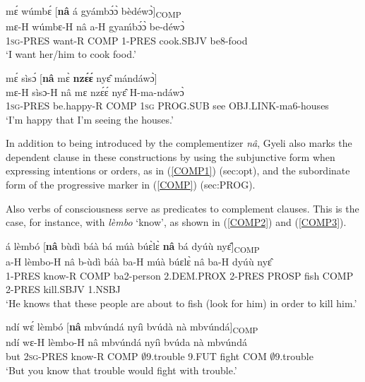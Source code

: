 \begin{exe}
\ex\label{COMP1}
  \glll  mɛ́ wúmbɛ́ [{\bfseries nâ} á gyámbɔ́ɔ̀ bèdéwɔ̀]\textsubscript{COMP} \\
         mɛ-H wúmbɛ-H nâ a-H gyaḿbɔ́ɔ̀ be-déwɔ̀ \\
         1\textsc{sg}-PRES want-R COMP 1-PRES cook.SBJV be8-food \\ 
    \trans `I want her/him to cook food.'
\end{exe}

\begin{exe}
\ex\label{COMP}
  \glll mɛ́  sìsɔ́ [{\bfseries nâ} mɛ̀ {\bfseries nzɛ́ɛ́} nyɛ̂ mándáwɔ̀] \\
         mɛ-H sìsɔ-H nâ mɛ nzɛ́ɛ́ nyɛ̂ H-ma-ndáwɔ̀ \\
         1\textsc{sg}-PRES be.happy-R COMP 1\textsc{sg} PROG.SUB see OBJ.LINK-ma6-houses \\
    \trans `I'm happy that I'm seeing the houses.'
\end{exe}

In addition to being introduced by the complementizer {\itshape nâ}, Gyeli also marks the dependent clause in these constructions by using the subjunctive form when expressing intentions or orders, as in (\ref{COMP1}) ({sec:opt}), and the subordinate form of the progressive marker in (\ref{COMP}) ({sec:PROG}).


Also verbs of consciousness serve as predicates to complement clauses. This is the case, for instance, with {\itshape lèmbo} `know', as shown in (\ref{COMP2}) and (\ref{COMP3}).

\begin{exe} 
\ex\label{COMP2}
  \glll   á lèmbó [{\bfseries nâ} bùdì báà bá múà búɛ̀lɛ̀ {\bfseries nâ} bá dyúù nyɛ̂]\textsubscript{COMP}  \\
          a-H lèmbo-H nâ b-ùdì báà ba-H múà búɛlɛ̀ nâ ba-H dyúù nyɛ̂  \\
1-PRES know-R COMP ba2-person 2.DEM.PROX 2-PRES PROSP fish COMP 2-PRES kill.SBJV 1.NSBJ   \\
    \trans `He knows that these people are about to fish (look for him) in order to kill him.'
\end{exe}

\begin{exe} 
\ex\label{COMP3} 
  \glll ndí wɛ́ lèmbó [{\bfseries nâ} mbvúndá nyíì bvúdà nà mbvúndá]\textsubscript{COMP} \\
        ndí wɛ-H lèmbo-H nâ mbvúndá nyíì bvúda nà mbvúndá \\
         but 2\textsc{sg}-PRES know-R COMP $\emptyset$9.trouble 9.FUT fight COM $\emptyset$9.trouble \\
    \trans `But you know that trouble would fight with trouble.'
\end{exe}


